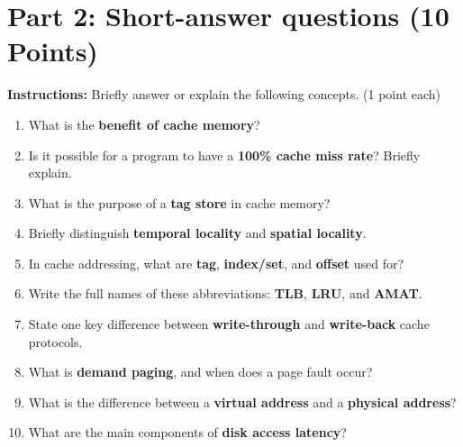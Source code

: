 \documentclass[a4paper,12pt]{article}
\begin{document}
\newpage

\section*{Part 2: Short-answer questions (10 Points)}
\textbf{Instructions:} Briefly answer or explain the following concepts. (1 point each)

\begin{enumerate}[label=\textbf{\arabic*.}]
    \item What is the \textbf{benefit of cache memory}?
    \vspace{0.8cm}

    \item Is it possible for a program to have a \textbf{100\% cache miss rate}? Briefly explain.
    \vspace{1.0cm}

    \item What is the purpose of a \textbf{tag store} in cache memory?
    \vspace{0.8cm}

    \item Briefly distinguish \textbf{temporal locality} and \textbf{spatial locality}.
    \vspace{1.0cm}

    \item In cache addressing, what are \textbf{tag}, \textbf{index/set}, and \textbf{offset} used for?
    \vspace{1.0cm}

    \item Write the full names of these abbreviations: \textbf{TLB}, \textbf{LRU}, and \textbf{AMAT}.
    \vspace{0.8cm}

    \item State one key difference between \textbf{write-through} and \textbf{write-back} cache protocols.
    \vspace{1.0cm}

    \item What is \textbf{demand paging}, and when does a page fault occur?
    \vspace{1.0cm}

    \item What is the difference between a \textbf{virtual address} and a \textbf{physical address}?
    \vspace{1.0cm}

    \item What are the main components of \textbf{disk access latency}?
    \vspace{0.8cm}
\end{enumerate}
\end{document}
